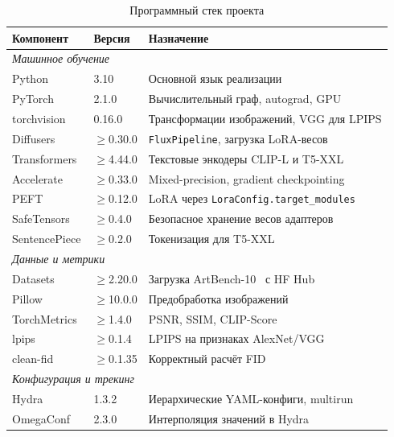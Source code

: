 \begin{table}[h]
    \centering
    \footnotesize
    \caption{Программный стек проекта}
    \label{tab:stack}
    \begin{tabular}{p{3.6cm} p{1.8cm} p{8.0cm}}
        \toprule
        \textbf{Компонент} & \textbf{Версия} & \textbf{Назначение} \\
        \midrule
        \multicolumn{3}{l}{\textit{Машинное обучение}} \\
        Python & 3.10 & Основной язык реализации \\
        PyTorch~\cite{paszke2019pytorch} & 2.1.0 & Вычислительный граф, autograd, GPU \\
        torchvision & 0.16.0 & Трансформации изображений, VGG для LPIPS \\
        Diffusers & $\geq$0.30.0 & \texttt{FluxPipeline}, загрузка LoRA-весов \\
        Transformers~\cite{wolf2020transformers} & $\geq$4.44.0 & Текстовые энкодеры CLIP-L и T5-XXL \\
        Accelerate~\cite{accelerate2022} & $\geq$0.33.0 & Mixed-precision, gradient checkpointing \\
        PEFT~\cite{hu2022lora} & $\geq$0.12.0 & LoRA через \texttt{LoraConfig.target\_modules} \\
        SafeTensors & $\geq$0.4.0 & Безопасное хранение весов адаптеров \\
        SentencePiece & $\geq$0.2.0 & Токенизация для T5-XXL \\
        \midrule
        \multicolumn{3}{l}{\textit{Данные и метрики}} \\
        Datasets & $\geq$2.20.0 & Загрузка ArtBench-10~\cite{liao2022artbench} с HF Hub \\
        Pillow & $\geq$10.0.0 & Предобработка изображений \\
        TorchMetrics & $\geq$1.4.0 & PSNR, SSIM, CLIP-Score \\
        lpips~\cite{zhang2018lpips} & $\geq$0.1.4 & LPIPS на признаках AlexNet/VGG \\
        clean-fid~\cite{parmar2022cleanfid} & $\geq$0.1.35 & Корректный расчёт FID \\
        \midrule
        \multicolumn{3}{l}{\textit{Конфигурация и трекинг}} \\
        Hydra~\cite{von2022hydra} & 1.3.2 & Иерархические YAML-конфиги, multirun \\
        OmegaConf & 2.3.0 & Интерполяция значений в Hydra \\

\end{tabular}
\end{table}
